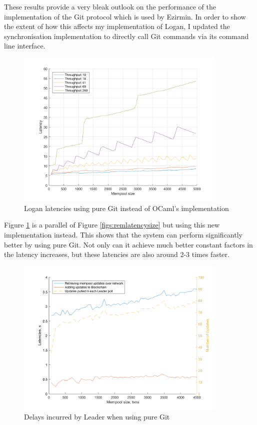 \documentclass[12pt,a4paper,twoside,openright]{report}
\begin{document}
	These results provide a very bleak outlook on the performance of the implementation of the Git protocol which is used by Ezirmin.
	In order to show the extent of how this affects my implementation of Logan, I updated the synchronisation implementation to directly call Git commands via its command line interface.
	\begin{figure}
		\centering
		\includegraphics[width=0.9\textwidth]{figs/latency_sizes_throughputs.png}
		\caption{Logan latencies using pure Git instead of OCaml's implementation}
		\label{figs:latenciespuregit}
	\end{figure}
	Figure \ref{figs:latenciespuregit} is a parallel of Figure \ref{figs:remlatencysize} but using this new implementation instead. 
	This shows that the system can perform significantly better by using pure Git. 
	Not only can it achieve much better constant factors in the latency increases, but these latencies are also around 2-3 times faster.
	\begin{figure}
		\centering
		\includegraphics[width=0.9\textwidth]{figs/bottlenecks.png}
		\caption{Delays incurred by Leader when using pure Git}
		\label{figs:bottleneckspuregit}
	\end{figure}
\end{document}
